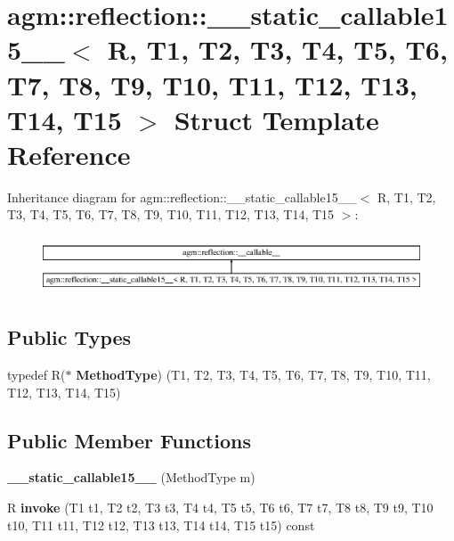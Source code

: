 \hypertarget{structagm_1_1reflection_1_1____static__callable15____}{}\section{agm\+:\+:reflection\+:\+:\+\_\+\+\_\+static\+\_\+callable15\+\_\+\+\_\+$<$ R, T1, T2, T3, T4, T5, T6, T7, T8, T9, T10, T11, T12, T13, T14, T15 $>$ Struct Template Reference}
\label{structagm_1_1reflection_1_1____static__callable15____}
Inheritance diagram for agm\+:\+:reflection\+:\+:\+\_\+\+\_\+static\+\_\+callable15\+\_\+\+\_\+$<$ R, T1, T2, T3, T4, T5, T6, T7, T8, T9, T10, T11, T12, T13, T14, T15 $>$\+:\begin{figure}[H]
\begin{center}
\leavevmode
\includegraphics[height=1.725732cm]{structagm_1_1reflection_1_1____static__callable15____}
\end{center}
\end{figure}
\subsection*{Public Types}
\begin{DoxyCompactItemize}
\item 
typedef R($\ast$ {\bfseries Method\+Type}) (T1, T2, T3, T4, T5, T6, T7, T8, T9, T10, T11, T12, T13, T14, T15)\hypertarget{structagm_1_1reflection_1_1____static__callable15_____aac70c899100e34f20df8b688729dfcc0}{}\label{structagm_1_1reflection_1_1____static__callable15_____aac70c899100e34f20df8b688729dfcc0}

\end{DoxyCompactItemize}
\subsection*{Public Member Functions}
\begin{DoxyCompactItemize}
\item 
{\bfseries \+\_\+\+\_\+static\+\_\+callable15\+\_\+\+\_\+} (Method\+Type m)\hypertarget{structagm_1_1reflection_1_1____static__callable15_____a52cee8710588905c49a44ca2983d7db6}{}\label{structagm_1_1reflection_1_1____static__callable15_____a52cee8710588905c49a44ca2983d7db6}

\item 
R {\bfseries invoke} (T1 t1, T2 t2, T3 t3, T4 t4, T5 t5, T6 t6, T7 t7, T8 t8, T9 t9, T10 t10, T11 t11, T12 t12, T13 t13, T14 t14, T15 t15) const \hypertarget{structagm_1_1reflection_1_1____static__callable15_____ac140cb46691c1b367189094349f5efbd}{}\label{structagm_1_1reflection_1_1____static__callable15_____ac140cb46691c1b367189094349f5efbd}

\end{DoxyCompactItemize}
